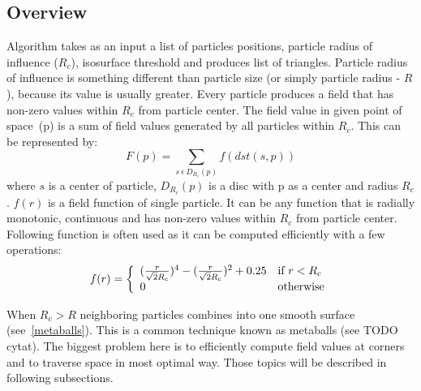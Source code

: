 \subsection{Overview} \label{sec:iso_overview}
Algorithm takes as an input a list of particles positions, particle radius of influence ($R_c$), isosurface threshold and produces list of triangles. Particle radius of influence is something different than particle size (or simply particle radius - $R$), because its value is usually greater. Every particle produces a field that has non-zero values within $R_c$ from particle center. The field value in given point of space~(p) is a sum of field values generated by all particles within $R_c$. This can be represented by:
\begin{equation}
\label{eq:field_equation}
F(p) = \sum_{s~\epsilon~D_{R_c}(p)} f(dst(s, p))
\end{equation}
where $s$ is a center of particle, $D_{R_c}(p)$ is a disc with p as a center and radius $R_c$. $f(r)$ is a field function of single particle. It can be any function that is radially monotonic, continuous and has non-zero values within $R_c$ from particle center. Following function is often used as it can be computed efficiently with a few operations:
\begin{equation}
\label{eq:single_field_equation}
f(r) = \left\{ \begin{array}{ll}
({r \over \sqrt{2}R_c} )^4 - ( {r \over \sqrt{2}R_c} )^2 + 0.25 & \textrm{if $r < R_c$}\\
0 & \textrm{otherwise}\\
\end{array} \right.
\end{equation}

When $R_c > R$ neighboring particles combines into one smooth surface  (see~\ref{metaballs}). This is a common technique known as metaballs (see TODO cytat). The biggest problem here is to efficiently compute field values at corners and to traverse space in most optimal way. Those topics will be described in following subsections.
 

